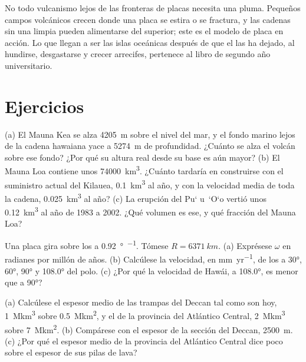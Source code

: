 No todo vulcanismo lejos de las fronteras de placas necesita una pluma. Pequeños campos volcánicos crecen donde una placa se estira o se fractura, y
las cadenas sin una  limpia pueden alimentarse del  superior; este es el modelo de placa en acción. Lo que llegan a ser las
islas oceánicas después de que el  las ha dejado, al hundirse, desgastarse y crecer arrecifes, pertenece al libro de segundo año universitario.

\section{Ejercicios}

\begin{exercise}[$\star$]\label{exo:b1:hotspots:1}
(a) El Mauna Kea se alza \qty{4205}{m} sobre el nivel del mar, y el fondo marino lejos de la cadena hawaiana yace a \qty{5274}{m} de profundidad.
¿Cuánto se alza el volcán sobre ese fondo? ¿Por qué su altura real desde su base es aún mayor?
(b) El Mauna Loa contiene unos \qty{74000}{km^3}. ¿Cuánto tardaría en construirse con el suministro actual del Kilauea, \qty{0.1}{km^3} al año,
y con la velocidad media de toda la cadena, \qty{0.025}{km^3} al año?
(c) La erupción del Pu\textquoteleft
u~\textquoteleft O\textquoteleft o vertió unos \qty{0.12}{km^3} al año de 1983 a 2002. ¿Qué volumen es ese, y qué fracción del Mauna Loa?
\end{exercise}

\begin{exercise}[$\star$]\label{exo:b1:hotspots:2}
Una placa gira sobre los  a \qty{0.92}{\degree\per\Myr}. Tómese $R = \qty{6371}{km}$. (a) Exprésese $\omega$ en radianes por millón
de años. (b) Calcúlese la velocidad, en \unit{mm.yr^{-1}}, de los  a \ang{30}, \ang{60}, \ang{90} y \ang{108.0} del polo. (c) ¿Por qué la
velocidad de Hawái, a \ang{108.0}, es menor que a \ang{90}?
\end{exercise}

\begin{exercise}[$\star$]\label{exo:b1:hotspots:3}
(a) Calcúlese el espesor medio de las trampas del Deccan tal como son hoy, \qty{1}{\mega km^3} sobre \qty{0.5}{\mega km^2}, y el de la provincia del
Atlántico Central, \qty{2}{\mega km^3} sobre \qty{7}{\mega km^2}. (b) Compárese con el espesor de la sección del Deccan, \qty{2500}{m}. (c) ¿Por qué el
espesor medio de la provincia del Atlántico Central dice poco sobre el espesor de sus pilas de lava?
\end{exercise}

